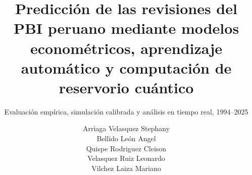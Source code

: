 \documentclass{ceri/sty/rapport}
\title{Predicción de las revisiones del PBI peruano mediante modelos econométricos, aprendizaje automático y computación de reservorio cuántico}
\subtitle{Evaluación empírica, simulación calibrada y análisis en tiempo real, 1994--2025}
\author{
	Arriaga Velasquez Stephany \\
	Bellido León Angel \\
	Quispe Rodriguez Cleison \\
	Velasquez Ruiz Leonardo \\
	Vilchez Laiza Mariano
}
\theoremstyle{definition}
\begin{document}
	
	\maketitle
	
	\sloppy
	
	
	
	
	
	
	
	
	
	
	
	
	
	
	
	
\end{document}
